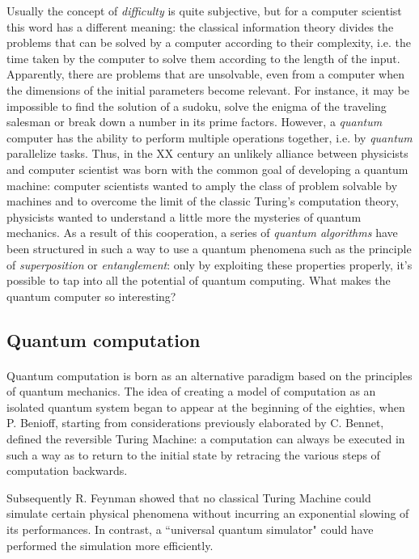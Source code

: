 \documentclass[a4paper,10pt]{article}
\begin{document}
Usually the concept of \textit{difficulty} is quite subjective, but for a computer scientist this word has a different meaning: the classical information theory divides the problems that can be solved by a computer according to their complexity, i.e. the time taken by the computer to solve them according to the length of the input. Apparently, there are problems that are unsolvable, even from a computer when the dimensions of the initial parameters become relevant. For instance, it may be impossible to find the solution of a sudoku, solve the enigma of the traveling salesman or break down a number in its prime factors. However, a \textit{quantum} computer has the ability to perform multiple operations together, i.e. by \textit{quantum} parallelize tasks. Thus, in the XX century an unlikely alliance between physicists and computer scientist was born with the common goal of developing a quantum machine: computer scientists wanted to amply the class of problem solvable by machines and to overcome the limit of the classic Turing's computation theory, physicists wanted to understand a little more the mysteries of quantum mechanics. As a result of this cooperation, a series of \textit{quantum algorithms} have been structured in such a way to use a quantum phenomena such as the principle of \textit{superposition} or \textit{entanglement}: only by exploiting these properties properly, it's possible to tap into all the potential of quantum computing. What makes the quantum computer so interesting?

\subsection{Quantum computation} 

\paragraph{} Quantum computation is born as an alternative paradigm based on the principles of quantum mechanics. The idea of creating a model of computation as an isolated quantum system began to appear at the beginning of the eighties, when P. Benioff, starting from considerations previously elaborated by C. Bennet, defined the reversible Turing Machine: a computation can always be executed in such a way as to return to the initial state by retracing the various steps of computation backwards.

Subsequently R. Feynman showed that no classical Turing Machine could simulate certain physical phenomena without incurring an exponential slowing of its performances. In contrast, a ``universal quantum simulator" could have performed the simulation more efficiently.
\end{document}
